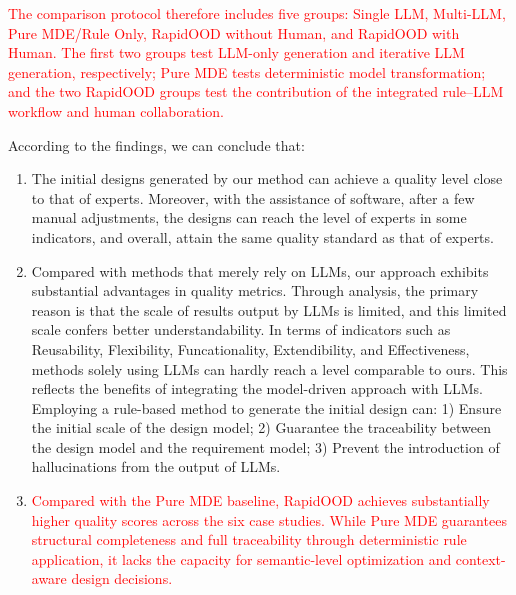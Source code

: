 \documentclass[pdflatex,sn-mathphys-num]{sn-jnl}%
\theoremstyle{thmstyleone}%
\theoremstyle{thmstyletwo}%
\theoremstyle{thmstylethree}%
\begin{document}
\textcolor{red}{The comparison protocol therefore includes five groups: Single LLM, Multi-LLM, Pure MDE/Rule Only, RapidOOD without Human, and RapidOOD with Human. The first two groups test LLM-only generation and iterative LLM generation, respectively; Pure MDE tests deterministic model transformation; and the two RapidOOD groups test the contribution of the integrated rule--LLM workflow and human collaboration.}

According to the findings, we can conclude that:
\begin{enumerate}
    \item The initial designs generated by our method can achieve a quality level close to that of experts. Moreover, with the assistance of software, after a few manual adjustments, the designs can reach the level of experts in some indicators, and overall, attain the same quality standard as that of experts.
    \item Compared with methods that merely rely on LLMs, our approach exhibits substantial advantages in quality metrics. Through analysis, the primary reason is that the scale of results output by LLMs is limited, and this limited scale confers better understandability. In terms of indicators such as Reusability, Flexibility, Funcationality, Extendibility, and Effectiveness, methods solely using LLMs can hardly reach a level comparable to ours. This reflects the benefits of integrating the model-driven approach with LLMs. Employing a rule-based method to generate the initial design can: 
    1) Ensure the initial scale of the design model; 
    2) Guarantee the traceability between the design model and the requirement model; 
    3) Prevent the introduction of hallucinations from the output of LLMs. 
    \item \textcolor{red}{Compared with the Pure MDE baseline, RapidOOD achieves substantially higher quality scores across the six case studies. While Pure MDE guarantees structural completeness and full traceability through deterministic rule application, it lacks the capacity for semantic-level optimization and context-aware design decisions.}
\end{enumerate}
\end{document}
